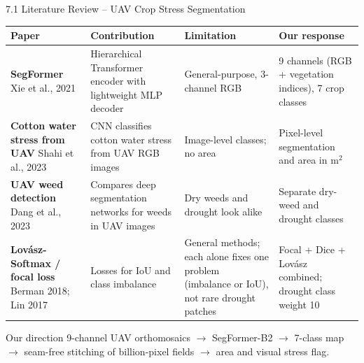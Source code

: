 \documentclass[aspectratio=169,10pt]{beamer}
\begin{document}
\begin{frame}{7.1 Literature Review -- UAV Crop Stress Segmentation}
\footnotesize
\renewcommand{\arraystretch}{1.22}
\begin{tabularx}{\textwidth}{|>{\raggedright\arraybackslash}p{3.3cm}|Y|Y|Y|}
\hline
\textbf{Paper} & \textbf{Contribution} & \textbf{Limitation} & \textbf{Our response} \\ \hline
\textbf{SegFormer} \newline Xie et al., 2021 & Hierarchical Transformer encoder with lightweight MLP decoder & General-purpose, 3-channel RGB & 9 channels (RGB + vegetation indices), 7 crop classes \\ \hline
\textbf{Cotton water stress from UAV} \newline Shahi et al., 2023 & CNN classifies cotton water stress from UAV RGB images & Image-level classes; no area & Pixel-level segmentation and area in m$^2$ \\ \hline
\textbf{UAV weed detection} \newline Dang et al., 2023 & Compares deep segmentation networks for weeds in UAV images & Dry weeds and drought look alike & Separate dry-weed and drought classes \\ \hline
\textbf{Lov\'asz-Softmax / focal loss} \newline Berman 2018; Lin 2017 & Losses for IoU and class imbalance & General methods; each alone fixes one problem (imbalance or IoU), not rare drought patches & Focal + Dice + Lov\'asz combined; drought class weight 10 \\ \hline
\end{tabularx}
\begin{card}{Our direction}
\footnotesize 9-channel UAV orthomosaics $\rightarrow$ SegFormer-B2 $\rightarrow$ 7-class map $\rightarrow$ seam-free stitching of billion-pixel fields $\rightarrow$ area and visual stress flag.
\end{card}
\end{frame}
\end{document}
